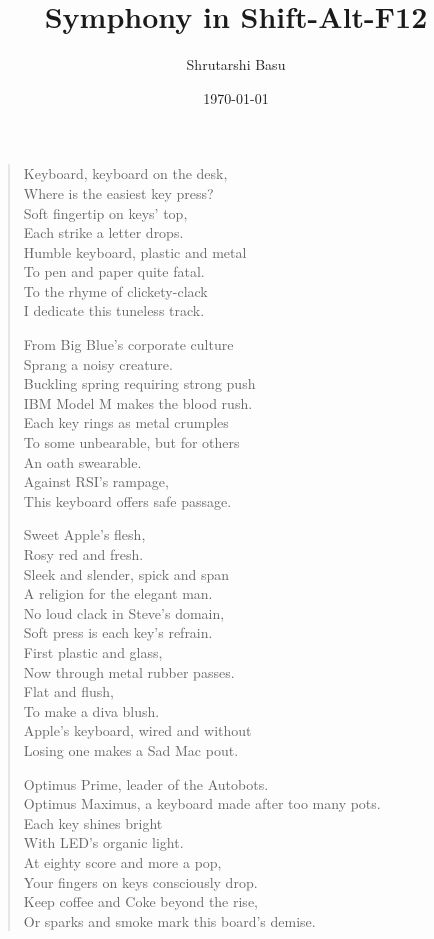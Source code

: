 \documentclass[12pt,letterpaper]{article}
\title{Symphony in Shift-Alt-F12}
\author{Shrutarshi Basu}
\date{\today}
\begin{document}
\maketitle
\begin{verse}
Keyboard, keyboard on the desk,\\ 
Where is the easiest key press?\\ 
Soft fingertip on keys' top,\\ 
Each strike a letter drops.\\ 
Humble keyboard, plastic and metal\\ 
To pen and paper quite fatal.\\ 
To the rhyme of clickety-clack\\ 
I dedicate this tuneless track.

From Big Blue's corporate culture\\ 
Sprang a noisy creature.\\ 
Buckling spring requiring strong push\\ 
IBM Model M makes the blood rush.\\ 
Each key rings as metal crumples\\ 
To some unbearable, but for others\\ 
An oath swearable.\\ 
Against RSI's rampage,\\ 
This keyboard offers safe passage. 
 
Sweet Apple's flesh,\\ 
Rosy red and fresh.\\ 
Sleek and slender, spick and span\\ 
A religion for the elegant man.\\ 
No loud clack in Steve's domain,\\ 
Soft press is each key's refrain.\\ 
First plastic and glass,\\ 
Now through metal rubber passes.\\ 
Flat and flush,\\ 
To make a diva blush.\\ 
Apple's keyboard, wired and without\\ 
Losing one makes a Sad Mac pout. 
 
Optimus Prime, leader of the Autobots.\\ 
Optimus Maximus, a keyboard made after too many pots.\\ 
Each key shines bright\\ 
With LED's organic light.\\ 
At eighty score and more a pop,\\ 
Your fingers on keys consciously drop.\\ 
Keep coffee and Coke beyond the rise,\\ 
Or sparks and smoke mark this board's demise. 
 

\end{verse}
\end{document}
